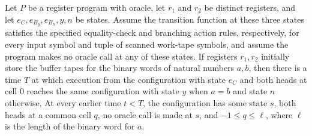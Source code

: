 \begin{lemma}
\label{Complexity.LogProg.eq_run}
\leanok
{}
Let $P$ be a register program with oracle, let $r_1$ and $r_2$ be distinct registers,
and let $e_C,e_{B_y},e_{B_n},y,n$ be states. Assume the transition function at these
three states satisfies the specified equality-check and branching action rules,
respectively, for every input symbol and tuple of scanned work-tape symbols, and assume
the program makes no oracle call at any of these states. If registers $r_1,r_2$
initially store the buffer tapes for the binary words of natural numbers $a,b$, then
there is a time $T$ at which execution from the configuration with state $e_C$ and both
heads at cell $0$ reaches the same configuration with state $y$ when $a=b$ and state $n$
otherwise. At every earlier time $t<T$, the configuration has some state $s$, both heads
at a common cell $q$, no oracle call is made at $s$, and $-1\le q\le \ell$, where $\ell$
is the length of the binary word for $a$.
\end{lemma}
